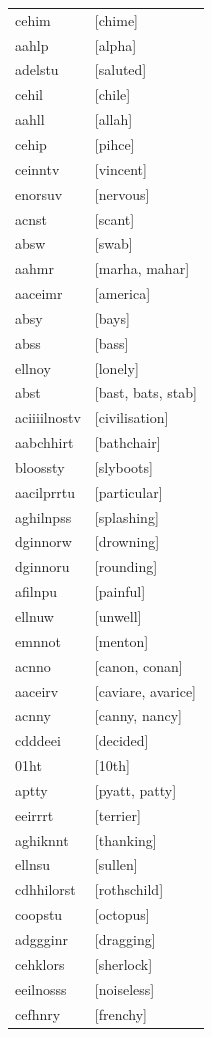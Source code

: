 \documentclass{article}
\begin{document}
\begin{tabular}{ll}
cehim & [chime] \\
aahlp & [alpha] \\
adelstu & [saluted] \\
cehil & [chile] \\
aahll & [allah] \\
cehip & [pihce] \\
ceinntv & [vincent] \\
enorsuv & [nervous] \\
acnst & [scant] \\
absw & [swab] \\
aahmr & [marha, mahar] \\
aaceimr & [america] \\
absy & [bays] \\
abss & [bass] \\
ellnoy & [lonely] \\
abst & [bast, bats, stab] \\
aciiiilnostv & [civilisation] \\
aabchhirt & [bathchair] \\
bloossty & [slyboots] \\
aacilprrtu & [particular] \\
aghilnpss & [splashing] \\
dginnorw & [drowning] \\
dginnoru & [rounding] \\
afilnpu & [painful] \\
ellnuw & [unwell] \\
emnnot & [menton] \\
acnno & [canon, conan] \\
aaceirv & [caviare, avarice] \\
acnny & [canny, nancy] \\
cdddeei & [decided] \\
01ht & [10th] \\
aptty & [pyatt, patty] \\
eeirrrt & [terrier] \\
aghiknnt & [thanking] \\
ellnsu & [sullen] \\
cdhhilorst & [rothschild] \\
coopstu & [octopus] \\
adggginr & [dragging] \\
cehklors & [sherlock] \\
eeilnosss & [noiseless] \\
cefhnry & [frenchy] \\

\end{tabular}
\end{document}
